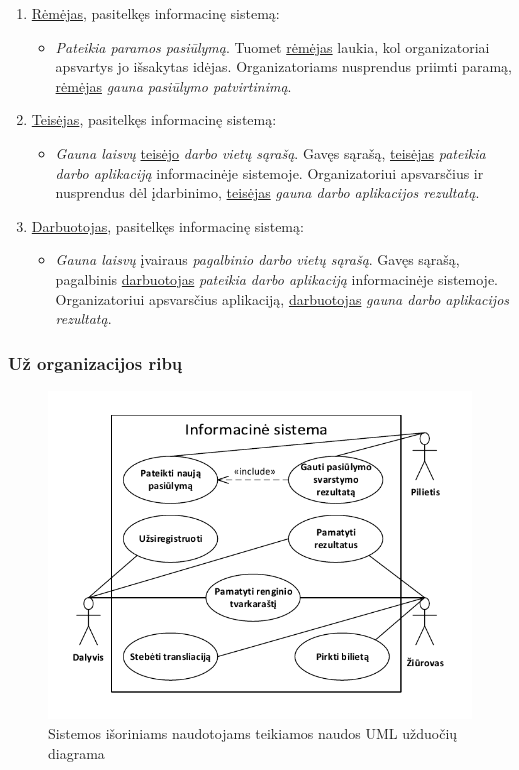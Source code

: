 \documentclass{VUMIFPSkursinis}
\begin{document}
		\begin{enumerate}
			\item \underline{Rėmėjas}, pasitelkęs informacinę sistemą:
			\begin{itemize}
				\item \textit{Pateikia paramos pasiūlymą}. Tuomet \underline{rėmėjas} laukia, kol organizatoriai apsvartys jo išsakytas
					idėjas. Organizatoriams nusprendus priimti paramą, \underline{rėmėjas} \textit{gauna pasiūlymo patvirtinimą}.
			\end{itemize}
			\item \underline{Teisėjas}, pasitelkęs informacinę sistemą:
			\begin{itemize}
				\item \textit{Gauna laisvų} \underline{teisėjo} \textit{darbo vietų sąrašą}. Gavęs sąrašą, \underline{teisėjas}
					\textit{pateikia darbo aplikaciją} informacinėje sistemoje. Organizatoriui apsvarsčius ir nusprendus dėl
					įdarbinimo, \underline{teisėjas} \textit{gauna darbo aplikacijos rezultatą}.
			\end{itemize}
			\item \underline{Darbuotojas}, pasitelkęs informacinę sistemą:
			\begin{itemize}
				\item \textit{Gauna laisvų} įvairaus \textit{pagalbinio darbo vietų sąrašą}. Gavęs sąrašą, pagalbinis \underline{darbuotojas}
					\textit{pateikia darbo aplikaciją} informacinėje sistemoje. Organizatoriui apsvarsčius aplikaciją, \underline{darbuotojas}
					\textit{gauna darbo aplikacijos rezultatą}.
			\end{itemize}
		\end{enumerate}
      
	\subsubsection*{Už organizacijos ribų}
	
		\begin{figure}[H]
			\centering
			\includegraphics[width=\textwidth]{img/IsPSI1ScenarijausUzduociuDiagrama3}
			\caption{Sistemos išoriniams naudotojams teikiamos naudos UML užduočių diagrama}
			\label{fig:scenarijusIsoresNaudotojuUzduociuDiagrama}
		\end{figure}
\end{document}
